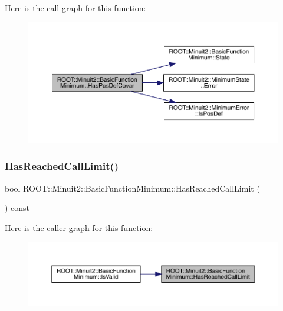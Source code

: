 Here is the call graph for this function\+:
\nopagebreak
\begin{figure}[H]
\begin{center}
\leavevmode
\includegraphics[width=350pt]{de/d25/classROOT_1_1Minuit2_1_1BasicFunctionMinimum_a82e819b720ca93301fdea10fc10af791_cgraph}
\end{center}
\end{figure}
\mbox{\label{classROOT_1_1Minuit2_1_1BasicFunctionMinimum_ab26a12c388b15f056c9effa0abcd7639}} 
\subsubsection{\texorpdfstring{HasReachedCallLimit()}{HasReachedCallLimit()}\hspace{0.1cm}{\footnotesize\ttfamily [1/2]}}
{\footnotesize\ttfamily bool R\+O\+O\+T\+::\+Minuit2\+::\+Basic\+Function\+Minimum\+::\+Has\+Reached\+Call\+Limit (\begin{DoxyParamCaption}{ }\end{DoxyParamCaption}) const\hspace{0.3cm}{\ttfamily [inline]}}

Here is the caller graph for this function\+:\nopagebreak
\begin{figure}[H]
\begin{center}
\leavevmode
\includegraphics[width=350pt]{de/d25/classROOT_1_1Minuit2_1_1BasicFunctionMinimum_ab26a12c388b15f056c9effa0abcd7639_icgraph}
\end{center}
\end{figure}
\mbox{\label{classROOT_1_1Minuit2_1_1BasicFunctionMinimum_ab26a12c388b15f056c9effa0abcd7639}} 
